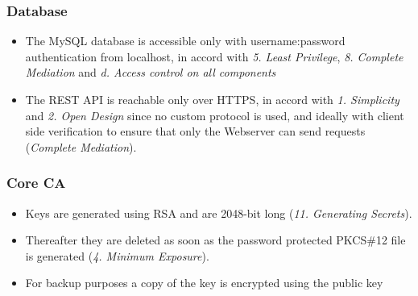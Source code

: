 \documentclass[english]{article}
\begin{document}
\subsubsection{Database}
\begin{itemize}
\item The MySQL database is accessible only with username:password authentication from localhost, in accord with \emph{5. Least Privilege}, \emph{8. Complete Mediation} and  \emph{d. Access control on all components}
\item The REST API is reachable only over HTTPS, in accord with \emph{1. Simplicity} and \emph{2. Open Design} since no custom protocol is used, and ideally with client side verification to ensure that only the Webserver can send requests (\emph{Complete Mediation}). %
\end{itemize}

\subsubsection{Core CA}
\begin{itemize}
\item Keys are generated using RSA and are 2048-bit long (\emph{11. Generating Secrets}). 
\item Thereafter they are deleted as soon as the password protected PKCS\#12 file is generated (\emph{4. Minimum Exposure}).
\item For backup purposes a copy of the key is encrypted using the public key
\end{itemize}
\end{document}
